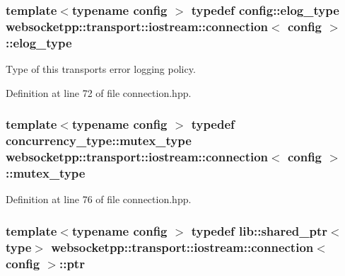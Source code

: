 \hypertarget{classwebsocketpp_1_1transport_1_1iostream_1_1connection_a3d5acbd564bf27265665f243b80fc251}{}
\subsubsection[{elog\+\_\+type}]{\setlength{\rightskip}{0pt plus 5cm}template$<$typename config $>$ typedef config\+::elog\+\_\+type {\bf websocketpp\+::transport\+::iostream\+::connection}$<$ config $>$\+::{\bf elog\+\_\+type}}\label{classwebsocketpp_1_1transport_1_1iostream_1_1connection_a3d5acbd564bf27265665f243b80fc251}


Type of this transport\textquotesingle{}s error logging policy. 



Definition at line 72 of file connection.\+hpp.

\hypertarget{classwebsocketpp_1_1transport_1_1iostream_1_1connection_a0950c8b57e0c6d7d3312490c6202f903}{}
\subsubsection[{mutex\+\_\+type}]{\setlength{\rightskip}{0pt plus 5cm}template$<$typename config $>$ typedef concurrency\+\_\+type\+::mutex\+\_\+type {\bf websocketpp\+::transport\+::iostream\+::connection}$<$ config $>$\+::{\bf mutex\+\_\+type}}\label{classwebsocketpp_1_1transport_1_1iostream_1_1connection_a0950c8b57e0c6d7d3312490c6202f903}


Definition at line 76 of file connection.\+hpp.

\hypertarget{classwebsocketpp_1_1transport_1_1iostream_1_1connection_a054436e87f6dc4404b13f6131707d2ab}{}
\subsubsection[{ptr}]{\setlength{\rightskip}{0pt plus 5cm}template$<$typename config $>$ typedef lib\+::shared\+\_\+ptr$<${\bf type}$>$ {\bf websocketpp\+::transport\+::iostream\+::connection}$<$ config $>$\+::{\bf ptr}}\label{classwebsocketpp_1_1transport_1_1iostream_1_1connection_a054436e87f6dc4404b13f6131707d2ab}



